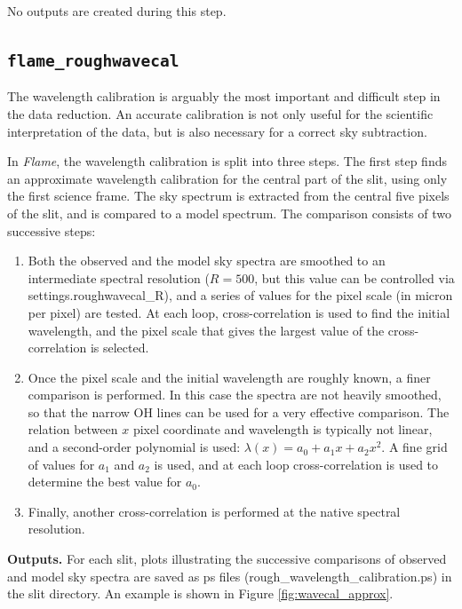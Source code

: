 \documentclass[a4paper]{article}
\newcommand{\flame}{\emph{Flame}}
\begin{document}
\begin{sloppypar}
\medskip
\noindent
No outputs are created during this step.


\subsection{\texttt{flame\_roughwavecal}}
\label{sec:roughwavecal}

The wavelength calibration is arguably the most important and difficult step in the data reduction. An accurate calibration is not only useful for the scientific interpretation of the data, but is also necessary for a correct sky subtraction.

In \flame, the wavelength calibration is split into three steps. The first step finds an approximate wavelength calibration for the central part of the slit, using only the first science frame. The sky spectrum is extracted from the central five pixels of the slit, and is compared to a model spectrum. The comparison consists of two successive steps:
\begin{enumerate}
\item Both the observed and the model sky spectra are smoothed to an intermediate spectral resolution ($R=500$, but this value can be controlled via settings.roughwavecal\_R), and a series of values for the pixel scale (in micron per pixel) are tested. At each loop, cross-correlation is used to find the initial wavelength, and the pixel scale that gives the largest value of the cross-correlation is selected.
\item Once the pixel scale and the initial wavelength are roughly known, a finer comparison is performed. In this case the spectra are not heavily smoothed, so that the narrow OH lines can be used for a very effective comparison. The relation between $x$ pixel coordinate and wavelength is typically not linear, and a second-order polynomial is used: $\lambda(x) = a_0 + a_1 x + a_2 x^2$. A fine grid of values for $a_1$ and $a_2$ is used, and at each loop cross-correlation is used to determine the best value for $a_0$.
\item Finally, another cross-correlation is performed at the native spectral resolution.
\end{enumerate}

\medskip
\noindent
\textbf{Outputs.} For each slit, plots illustrating the successive comparisons of observed and model sky spectra are saved as ps files (rough\_wavelength\_calibration.ps) in the slit directory. An example is shown in Figure \ref{fig:wavecal_approx}.


\end{sloppypar}
\end{document}
